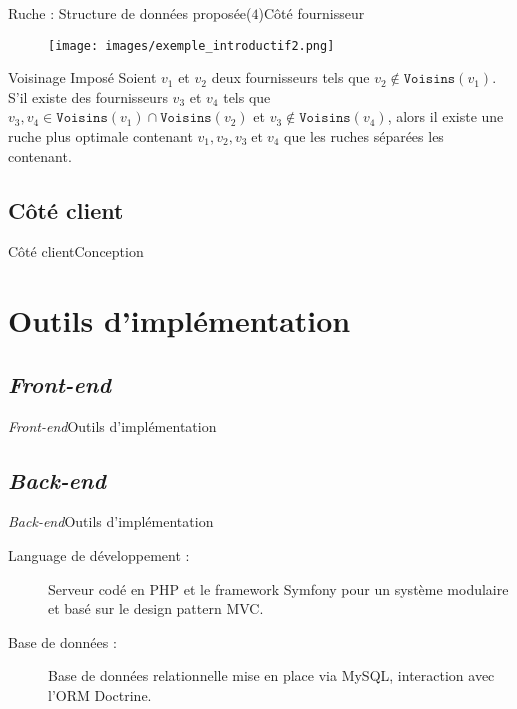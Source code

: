 \documentclass[usenames,dvipsnames]{beamer}
\begin{document}
\begin{frame}{Ruche : Structure de données proposée($4$)}{Côté fournisseur}
\begin{figure}[!ht]
  \centering
  \texttt{[image: images/exemple\_introductif2.png]}
\end{figure}

\begin{block}{Voisinage Imposé}
Soient $v_1$ et $v_2$ deux fournisseurs tels que $v_2 \notin \texttt{Voisins}(v_1)$. S'il existe des fournisseurs $v_3$ et $v_4$ tels que $v_3, v_4 \in \texttt{Voisins}(v_1) \cap \texttt{Voisins}(v_2)$ et $v_3 \notin \texttt{Voisins}(v_4)$, alors il existe une ruche plus optimale contenant $v_1, v_2, v_3\; \text{et}\; v_4$ que les ruches séparées les contenant.
\end{block}
\end{frame}

\subsection{Côté client}
\begin{frame}{Côté client}{Conception}
\end{frame}

\section{Outils d'implémentation}
\subsection{\protect\textit{Front-end}}
\begin{frame}{\textit{Front-end}}{Outils d'implémentation}
\end{frame}

\subsection{\protect\textit{Back-end}}
\begin{frame}{\textit{Back-end}}{Outils d'implémentation}
  \begin{description}
    \item[Language de développement :] Serveur codé en PHP et le framework Symfony pour un système modulaire et basé sur le design pattern MVC.
    \item[Base de données :] Base de données relationnelle mise en place via MySQL, interaction avec l'ORM Doctrine.
  \end{description}
\end{frame}
\end{document}
